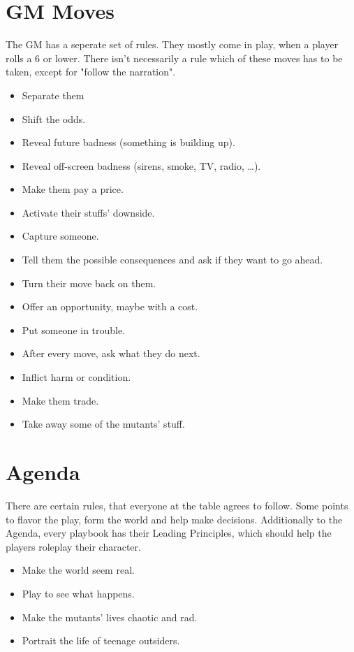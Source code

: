 \documentclass{book}
\begin{document}
\section*{GM Moves}
The GM has a seperate set of rules. They mostly come in play, when a player rolls a 6 or lower. There isn't necessarily a rule which of these moves has to be taken, except for "follow the narration".
\begin{itemize}
    \item Separate them
    \item Shift the odds.
    \item Reveal future badness (something is building up).
    \item Reveal off-screen badness (sirens, smoke, TV, radio, …).
    \item Make them pay a price.
    \item Activate their stuffs' downside.
    \item Capture someone.
    \item Tell them the possible consequences and ask if they want to go ahead.
    \item Turn their move back on them.
    \item Offer an opportunity, maybe with a cost.
    \item Put someone in trouble.
    \item After every move, ask what they do next.
    \item Inflict harm or condition.
    \item Make them trade.
    \item Take away some of the mutants' stuff.
\end{itemize}

\section*{Agenda}
There are certain rules, that everyone at the table agrees to follow. Some points to flavor the play, form the world and help make decisions. Additionally to the Agenda, every playbook has their Leading Principles, which should help the players roleplay their character.
\begin{itemize}
    \item Make the world seem real.
    \item Play to see what happens.
    \item Make the mutants' lives chaotic and rad.
    \item Portrait the life of teenage outsiders.
\end{itemize}

\newpage












\end{document}
